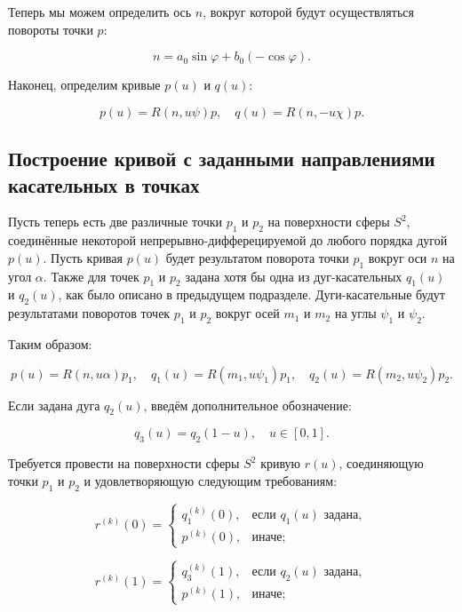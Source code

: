 Теперь мы можем определить ось $n$, вокруг которой будут осуществляться повороты точки $p$:

\begin{equation}
n=a_0\sin\varphi+b_0(-\cos\varphi).
\label{two-dimension-tangent-axis-3}
\end{equation}

Наконец, определим кривые $p(u)$ и $q(u)$:

$$
p(u)=R(n,u\psi)p, \quad q(u)=R(n,-u\chi)p.
$$

\subsection*{Построение кривой с заданными направлениями \mbox{касательных} в точках}

Пусть теперь есть две различные точки $p_1$ и $p_2$ на поверхности сферы $S^2$, соединённые некоторой
непрерывно-дифферецируемой до любого порядка дугой $p(u)$. Пусть кривая $p(u)$ будет результатом поворота точки $p_1$
вокруг оси $n$ на угол $\alpha$. Также для точек $p_1$ и $p_2$ задана хотя бы одна из дуг-касательных $q_1(u)$
и $q_2(u)$, как было описано в предыдущем подразделе. Дуги-касательные будут результатами поворотов точек $p_1$ и $p_2$
вокруг осей $m_1$ и $m_2$ на углы $\psi_1$ и $\psi_2$.

Таким образом:

$$
p(u)=R(n,u\alpha)p_1, \quad q_1(u)=R(m_1,u\psi_1)p_1, \quad q_2(u)=R(m_2,u\psi_2)p_2.
$$

Если задана дуга $q_2(u)$, введём дополнительное обозначение:

$$
q_3(u)=q_2(1-u), \quad u \in [0,1].
$$

Требуется провести на поверхности сферы $S^2$ кривую $r(u)$, соединяющую точки $p_1$ и $p_2$ и удовлетворяющую
следующим требованиям:

\begin{equation*}
r^{(k)}(0)=
  \begin{cases}
    q_1^{(k)}(0), & \text{если $q_1(u)$ задана}, \\
    p^{(k)}(0),   & \text{иначе};
  \end{cases}
\end{equation*}

\begin{equation*}
r^{(k)}(1)=
  \begin{cases}
    q_3^{(k)}(1), & \text{если $q_2(u)$ задана}, \\
    p^{(k)}(1),   & \text{иначе};
  \end{cases}
\end{equation*}


